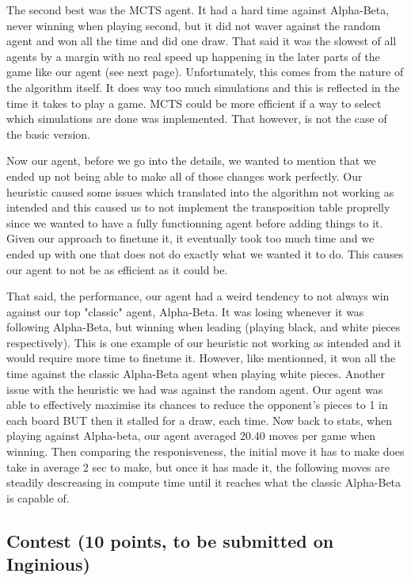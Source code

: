 \documentclass[11pt,a4paper]{report}
\begin{document}
\begin{answers}[23cm]
    The second best was the MCTS agent. It had a hard time against Alpha-Beta, never winning when playing second, but it did not waver against the random agent and won all the time and did one draw. 
    That said it was the slowest of all agents by a margin with no real speed up happening in the later parts of the game like our agent (see next page). 
    Unfortunately, this comes from the nature of the algorithm itself. It does way too much simulations and this is reflected in the time it takes to play a game. 
    MCTS could be more efficient if a way to select which simulations are done was implemented. That however, is not the case of the basic
    version. 

    \vspace{0.5cm}

    Now our agent, before we go into the details, we wanted to mention that we ended up not being able to make all of those changes work perfectly. 
    Our heuristic caused some issues which translated into the algorithm not working as intended and this caused us to not implement the transposition 
    table proprelly since we wanted to have a fully functionning agent before adding things to it. Given our approach to finetune it, it eventually took 
    too much time and we ended up with one that does not do exactly what we wanted it to do. This causes our agent to not be as efficient as it could be.

    That said, the performance, our agent had a weird tendency to not always win against our top "classic" agent, Alpha-Beta. It was losing whenever it 
    was following Alpha-Beta, but winning when leading (playing black, and white pieces respectively). This is one example of our heuristic not working 
    as intended and it would require more time to finetune it. However, like mentionned, it won all the time against the classic Alpha-Beta agent when playing
    white pieces. Another issue with the heuristic we had was against the random agent. Our agent was able to effectively maximise its chances to reduce 
    the opponent's pieces to 1 in each board BUT then it stalled for a draw, each time.  
    Now back to stats, when playing against Alpha-beta, our agent averaged 20.40 moves per game when winning. Then comparing the responisveness, 
    the initial move it has to make does take in average 2 sec to make, but once it has made it, the following moves are steadily descreasing in compute time
    until it reaches what the classic Alpha-Beta is capable of.

\end{answers}

\begin{answers}[23cm]
    
\end{answers}


\subsection{Contest (10 points, to be submitted on Inginious)}
\end{document}
